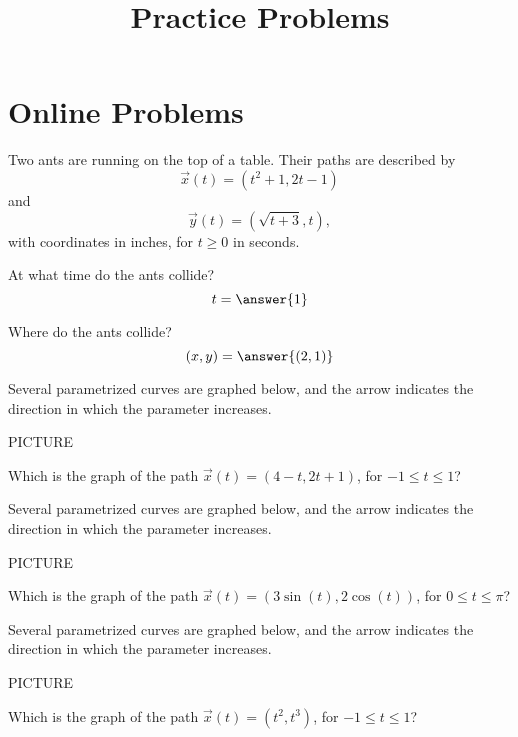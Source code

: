 \documentclass{ximera}
\title{Practice Problems}
\begin{document}
\begin{abstract}
\end{abstract}
\maketitle
\section{Online Problems}
\begin{problem}
Two ants are running on the top of a table. Their paths are described by
\[
\vec{x}(t) = (t^2+1,2t-1)
\]
and
\[
\vec{y}(t) = (\sqrt{t+3}, t),
\]
with coordinates in inches, for $t\geq 0$ in seconds.

At what time do the ants collide?
\[
t = \answer{1}
\]

Where do the ants collide?
\[
(x,y) = \answer{(2,1)}
\]

\end{problem}

\begin{problem}
Several parametrized curves are graphed below, and the arrow indicates the direction in which the parameter increases.

PICTURE

Which is the graph of the path $\vec{x}(t) = (4-t, 2t+1)$, for $-1\leq t\leq 1$?
\begin{multipleChoice}
\end{multipleChoice}
\end{problem}

\begin{problem}
Several parametrized curves are graphed below, and the arrow indicates the direction in which the parameter increases.

PICTURE

Which is the graph of the path $\vec{x}(t) = (3\sin(t), 2\cos(t))$, for $0\leq t\leq \pi$?
\begin{multipleChoice}
\end{multipleChoice}
\end{problem}

\begin{problem}
Several parametrized curves are graphed below, and the arrow indicates the direction in which the parameter increases.

PICTURE

Which is the graph of the path $\vec{x}(t) = (t^2, t^3)$, for $-1\leq t\leq 1$?
\begin{multipleChoice}
\end{multipleChoice}
\end{problem}
\end{document}
